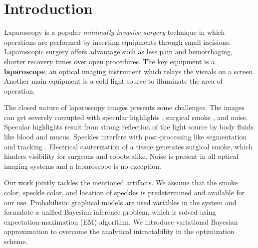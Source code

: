 
\newcommand{\etas}{\ensuremath{\eta_{\mathrm{s}}}}


\chapter{Introduction}

Laparoscopy is a popular \textit{minimally invasive surgery} technique in which operations are performed by inserting equipments through small incisions. Laparoscopic surgery offers advantage such as less pain and hemorrhaging, shorter recovery times over open procedures. The key equipment is a \textbf{laparoscope}, an optical imaging instrument which relays the visuals on a screen. Another main equipment is a cold light source to illuminate the area of operation.

The closed nature of laparoscopy images presents some challenges. The images can get severely corrupted with specular highlights \cite{stoyanov2005removing, saint2011detection}, surgical smoke \cite{barrett2003surgical}, and noise. Specular highlights result from strong reflection of the light source by body fluids like blood and mucus. Speckles interfere with post-processing like segmentation \cite{prokopetc2015segmentation, voros2007segmentation} and tracking \cite{wolf2011tracking}. Electrical cauterization of a tissue generates surgical smoke, which hinders visibility for surgeons and robots alike. Noise is present in all optical imaging systems and a laparoscope is no exception.

Our work jointly tackles the mentioned artifacts. We assume that the smoke color, speckle color, and location of speckles is predetermined and available for our use. Probabilistic graphical models are used variables in the system and formulate a unified Bayesian inference problem, which is solved using expectation-maximation (EM) algorithm. We introduce variational Bayesian approximation to overcome the analytical intractability in the optimization scheme.







